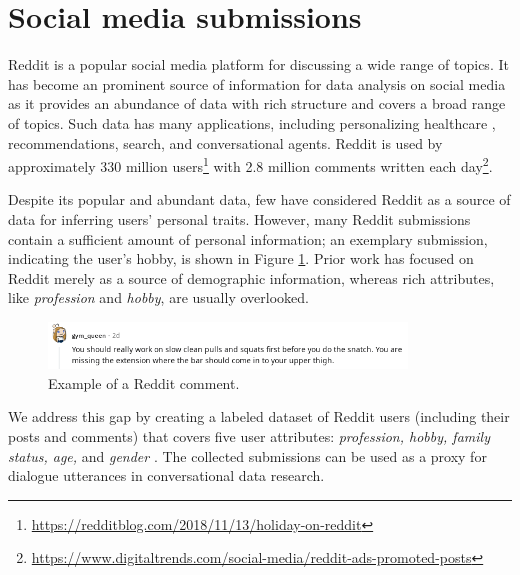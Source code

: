 
\section{Social media submissions}
\label{data_reddust}

Reddit is a popular social media platform for discussing a wide range of topics. It has become an prominent source of information for data analysis on social media as it provides an abundance of data with rich structure and covers a broad range of topics. Such data has many applications, including personalizing healthcare \cite{gyrard2018personalized}, recommendations, search, and conversational agents. 
Reddit is used by approximately 330 million users\footnote{ \href{https://redditblog.com/2018/11/13/holiday-on-reddit}{https://redditblog.com/2018/11/13/holiday-on-reddit}}
with 2.8 million comments written each day\footnote{ \href{https://www.digitaltrends.com/social-media/reddit-ads-promoted-posts}{https://www.digitaltrends.com/social-media/reddit-ads-promoted-posts}}. 

Despite its popular and abundant data, few have considered Reddit as a source of data for inferring users' personal traits. However, many Reddit submissions contain a sufficient amount of personal information; an exemplary submission, indicating the user's hobby, is shown in Figure \ref{fig:input}. Prior work has focused on Reddit merely as a source of demographic information, whereas rich attributes, like \textit{profession} and \textit{hobby}, are usually overlooked. 

\begin{figure}[th!]
\centering
\includegraphics[width=0.85\textwidth]{data/pics/gym_queen.png}
\caption{
Example of a Reddit comment.
}
\label{fig:input}
\end{figure}

We address this gap by creating a labeled dataset of Reddit users %
(including their posts and comments) that covers five user attributes: \textit{profession, hobby, family status, age,} and \emph{gender} \cite{tigunova2020reddust}. The collected submissions can be used as a proxy for dialogue utterances in conversational data research.

